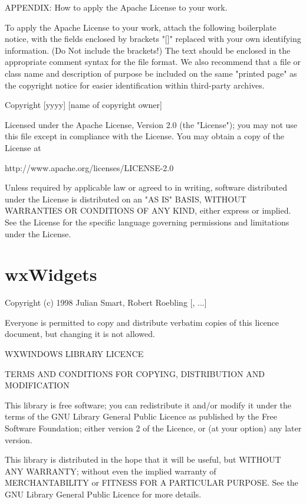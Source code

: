 \documentclass[twoside]{tceusermanual}
\begin{document}
   APPENDIX: How to apply the Apache License to your work.

      To apply the Apache License to your work, attach the following
      boilerplate notice, with the fields enclosed by brackets "[]"
      replaced with your own identifying information. (Do Not include
      the brackets!)  The text should be enclosed in the appropriate
      comment syntax for the file format. We also recommend that a
      file or class name and description of purpose be included on the
      same "printed page" as the copyright notice for easier
      identification within third-party archives.

   Copyright [yyyy] [name of copyright owner]

   Licensed under the Apache License, Version 2.0 (the "License");
   you may not use this file except in compliance with the License.
   You may obtain a copy of the License at

       http://www.apache.org/licenses/LICENSE-2.0

   Unless required by applicable law or agreed to in writing, software
   distributed under the License is distributed on an "AS IS" BASIS,
   WITHOUT WARRANTIES OR CONDITIONS OF ANY KIND, either express or implied.
   See the License for the specific language governing permissions and
   limitations under the License.

\section{wxWidgets}

Copyright (c) 1998 Julian Smart, Robert Roebling [, ...]

Everyone is permitted to copy and distribute verbatim copies
of this licence document, but changing it is not allowed.

WXWINDOWS LIBRARY LICENCE

TERMS AND CONDITIONS FOR COPYING, DISTRIBUTION AND MODIFICATION

This library is free software; you can redistribute it and/or modify it
under the terms of the GNU Library General Public Licence as published by
the Free Software Foundation; either version 2 of the Licence, or (at
your option) any later version.

This library is distributed in the hope that it will be useful, but
WITHOUT ANY WARRANTY; without even the implied warranty of
MERCHANTABILITY or FITNESS FOR A PARTICULAR PURPOSE. See the GNU Library
General Public Licence for more details.
\end{document}
